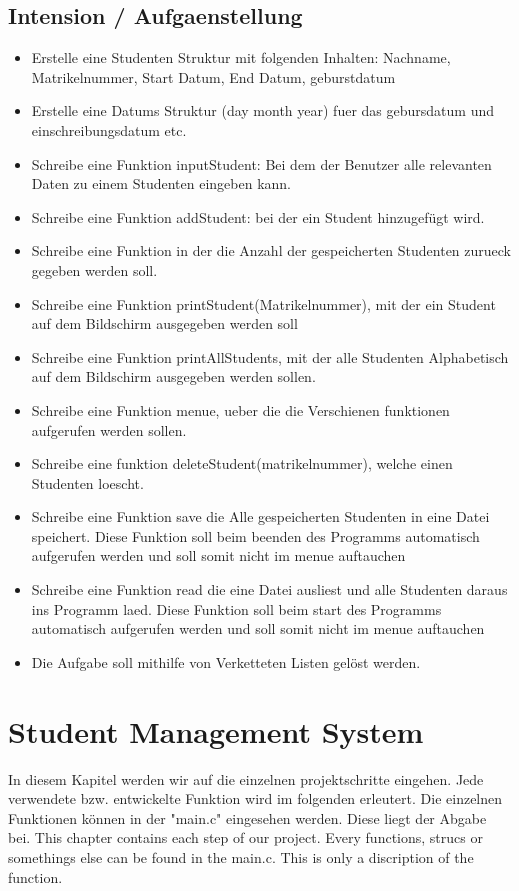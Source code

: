 \documentclass[a4paper, 11pt, oneside]{book} %
\begin{document}
\section{Intension / Aufgaenstellung} \label{aufgabe}
\begin{itemize}
\item Erstelle eine Studenten Struktur mit folgenden Inhalten: Nachname, Matrikelnummer, Start Datum, End Datum, geburstdatum
\item Erstelle eine Datums Struktur (day month year) fuer das gebursdatum und einschreibungsdatum etc.
\item Schreibe eine Funktion inputStudent: Bei dem der Benutzer alle relevanten Daten zu einem Studenten eingeben kann.
\item Schreibe eine Funktion addStudent: bei der ein Student hinzugefügt wird.
\item Schreibe eine Funktion in der die Anzahl der gespeicherten Studenten zurueck gegeben werden soll.
\item Schreibe eine Funktion printStudent(Matrikelnummer), mit der ein Student auf dem Bildschirm ausgegeben werden soll
\item Schreibe eine Funktion printAllStudents, mit der alle Studenten Alphabetisch auf dem Bildschirm ausgegeben werden sollen.
\item Schreibe eine Funktion menue, ueber die die Verschienen funktionen aufgerufen werden sollen.
\item Schreibe eine funktion deleteStudent(matrikelnummer), welche einen Studenten loescht.
\item Schreibe eine Funktion save die Alle gespeicherten Studenten in eine Datei speichert. Diese Funktion soll beim beenden des Programms automatisch aufgerufen werden und soll somit nicht im menue auftauchen
\item Schreibe eine Funktion read die eine Datei ausliest und alle Studenten daraus ins Programm laed. Diese Funktion soll beim start des Programms automatisch aufgerufen werden und soll somit nicht im menue auftauchen
\item Die Aufgabe soll mithilfe von Verketteten Listen gelöst werden.

\end{itemize}

\chapter{Student Management System} 
In diesem  Kapitel werden wir auf die einzelnen projektschritte eingehen. Jede verwendete bzw. entwickelte Funktion wird im folgenden erleutert. Die einzelnen Funktionen können in der "main.c" eingesehen werden. Diese liegt der Abgabe bei. \newline
This chapter contains each step of our project. Every functions, strucs or somethings else can be found in the main.c. This is only a discription of the function.
\end{document}
